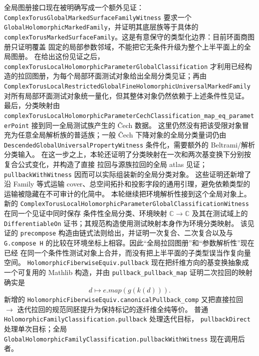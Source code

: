 \documentclass[UTF8,fontset=none,a4paper,11pt]{ctexart}
\begin{document}
\begin{sloppypar}\raggedright
全局图册接口现在被明确写成一个额外见证：
\texttt{ComplexTorusGlobalMarkedSurfaceFamilyWitness} 要求一个
\texttt{GlobalHolomorphicMarkedFamily}，并证明其底层族等于具体的
\texttt{complexTorusMarkedSurfaceFamily}。这是有意保守的类型化边界：目前环面商图册只证明覆盖
固定的局部参数邻域，不能把它无条件升级为整个上半平面上的全局图册。
在给出这份见证之后，\texttt{complexTorusLocalHolomorphicParameterGlobalClassification}
才利用已经构造的拉回图册，为每个局部环面测试对象给出全局分类见证；再由\linebreak[4]
\texttt{ComplexTorusLocalRestrictedGlobalFine}\linebreak[4]\texttt{HolomorphicUniversalMarkedFamily}
对所有局部环面测试对象统一量化，但其整体对象仍然依赖于上述条件性见证。
最后，分类映射由\linebreak[4]
\texttt{complexTorusLocalHolomorphicParameterCechClassification}\linebreak[4]
\texttt{\_map\_eq\_parameterPoint} 接到同一全局测试族产生的 Čech 数据。
这里仍然没有把该受限对象冒充为任意全局解析族的普适族；一般 Čech 下降对象的全局分类量词仍由
\texttt{DescendedGlobalUniversalPropertyWitness} 条件化，需要额外的 Beltrami/解析分类输入。
在这一步之上，本轮还证明了分类映射在一次和两次基变换下分别按复合公式变化，并构造了直接
拉回与源族拉回的全局 atlas 见证；\texttt{pullbackWithWitness} 因而可以实际组装新的全局分类对象。
这些证明还新增了沿 Family 等式运输 cover、总空间拓扑和投影字段的通用引理，避免依赖类型的
运输被隐藏在不可审计的化简中。
本轮继续把环境解析性接到这个全局对象上。新的
\texttt{ComplexTorusLocalHolomorphicParameterGlobalClassificationWitness} 在同一个见证中同时保存
条件性全局分类、环境映射 \(\mathbb C\to\mathbb C\) 及其在测试域上的
\texttt{DifferentiableOn} 证书；其规范构造使用测试映射本身作为环境分类映射。
该见证的 \texttt{precompose} 构造由链式法则给出，并证明一次复合、二次复合以及与
\texttt{G.compose H} 的比较在环境坐标上相容。因此“全局拉回图册”和“参数解析性”现在已经
在同一个条件性测试对象上合并，而没有把上半平面的子类型误当作复向量空间。
\texttt{HolomorphicFiberwiseEquiv.pullback} 现在把纤维方向的基变换抽象成一个可复用的
Mathlib 构造，并由 \texttt{pullback\_pullback\_map} 证明二次拉回的映射确实是
\[
  d\longmapsto e.map(g(k(d))).
\]
新增的 \texttt{HolomorphicFiberwiseEquiv.canonicalPullback\_comp} 又把直接拉回
\(\to\) 迭代拉回的规范同胚提升为保持标记的逐纤维全纯等价。
普通 \texttt{HolomorphicFamilyClassification.pullback} 处理迭代目标，
\texttt{pullbackDirect} 处理单次目标；全局
\texttt{GlobalHolomorphicFamilyClassification.pullbackWithWitness} 现在调用后者。

\end{sloppypar}
\end{document}

